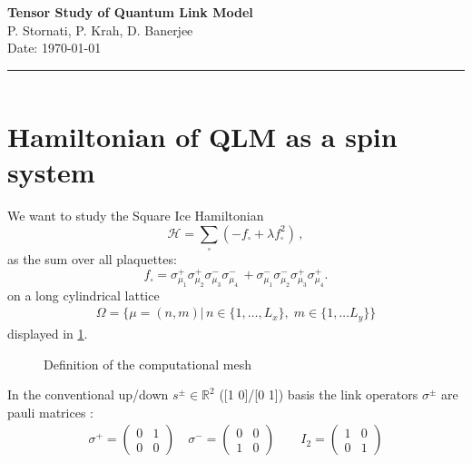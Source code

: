 \documentclass[12pt, a4paper, twoside, titlepage]{article}
\renewcommand{\H}{\ensuremath{\mathcal{H}}}
\begin{document}
\noindent \Large {\textbf{Tensor Study of Quantum Link Model}}
\normalsize
\\[2ex]
P. Stornati, P. Krah, D. Banerjee
\\[1ex]
Date: \today
\\[1ex]
\hrule$~$
  \\[2ex]






\section{Hamiltonian of QLM as a spin system}

We want to study the Square Ice Hamiltonian
\begin{equation}
    \H = \sum_\square (-f_\square + \lambda f^2_\square)\,,\label{eq:hamiltonian}
\end{equation}
as the sum over all plaquettes:
\begin{equation}\label{eq:plaquette}
       f_\square = \sigma^+_{\mu_1}\sigma^+_{\mu_2}\sigma^-_{\mu_3}\sigma^-_{\mu_4}\, +  \sigma^-_{\mu_1}\sigma^-_{\mu_2}\sigma^+_{\mu_3}\sigma^+_{\mu_4}.
\end{equation}
on a long cylindrical lattice 
\begin{align}\label{eq:geometry}
\Omega=\{\mu = (n,m) |\, n\in\{1,\dots,L_x\}, \;  m \in\{1,\dots L_y\}\}
\end{align}
displayed in \cref{fig:lattice}.
\begin{figure}[hp!]
  
  \caption{Definition of the computational mesh}
  \label{fig:lattice}
\end{figure}

In the conventional up/down $s^\pm\in\mathbb{R}^2$ ([1 0]/[0 1]) basis the  link operators 
$\sigma^{\pm}$ are pauli matrices :
\begin{align}
\sigma^+=
\begin{pmatrix}
0 & 1 \\
0 & 0
\end{pmatrix}
\quad
\sigma^-=
\begin{pmatrix}
0 & 0 \\
1 & 0
\end{pmatrix}
\qquad
I_2 =
\begin{pmatrix}
1 & 0 \\
0 & 1
\end{pmatrix}
\end{align}
\end{document}
